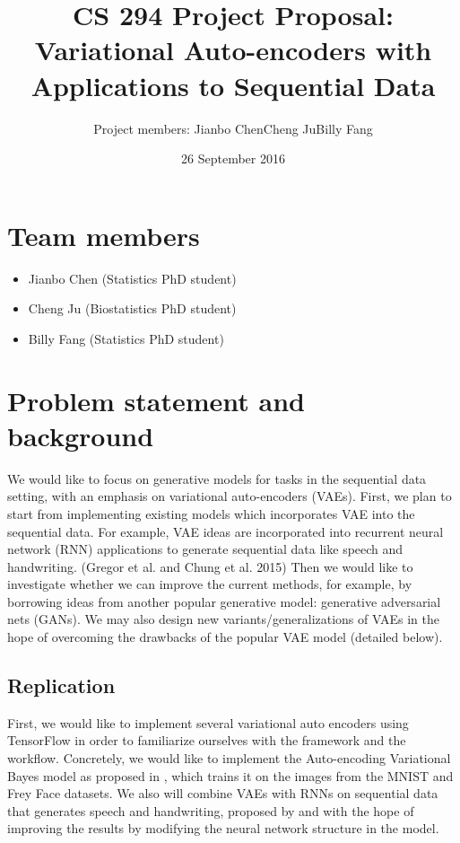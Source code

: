 \documentclass[11pt]{article}
\title{CS 294 Project Proposal:\\Variational Auto-encoders with Applications to Sequential Data}
\date{26 September 2016}
\author{Project members: Jianbo Chen\quad Cheng Ju\quad Billy Fang}
\begin{document}
\maketitle


\section*{Team members}

\begin{itemize}
    \item Jianbo Chen (Statistics PhD student)
    \item Cheng Ju (Biostatistics PhD student)
    \item Billy Fang (Statistics PhD student)
\end{itemize}

\section*{Problem statement and background}

We would like to focus on generative models for tasks in the sequential data setting, with an emphasis on variational auto-encoders (VAEs).  First, we plan to start from implementing existing models which incorporates VAE into the sequential data. For example, VAE ideas are incorporated into recurrent neural network (RNN) applications to generate sequential data like speech and handwriting. (Gregor et al. and Chung et al. 2015) Then we would like to investigate whether we can improve the current methods, for example, by borrowing ideas from another popular generative model:  generative adversarial nets (GANs). We may also design new variants/generalizations of VAEs in the hope of overcoming the drawbacks of the popular VAE model (detailed below).

\subsection*{Replication}

First, we would like to implement several variational auto encoders using TensorFlow in order to familiarize ourselves with the framework and the workflow. Concretely, we would like to implement the Auto-encoding Variational Bayes model as proposed in \cite{kingma2013auto}, which trains it on the images from the MNIST and Frey Face datasets. We also will combine VAEs with RNNs on sequential data that generates speech and handwriting, proposed by \cite{gregor2015draw} and \cite{chung2015recurrent} with the hope of improving the results by modifying the neural network structure in the model.
\end{document}
